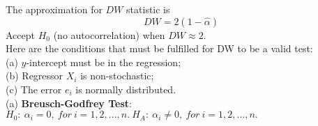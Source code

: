 \documentclass{article}
\begin{document}
\begin{enumerate}[S1 - ]
    The approximation for $DW$ statistic is
    \begin{equation*}
    DW = 2(1-\hat{\alpha})
    \end{equation*}
    Accept $H_0$ (no autocorrelation) when $DW \approx 2$.\\
    Here are the conditions that must be fulfilled for DW to be a valid test:\\
    (a) $y$-intercept must be in the regression;\\
    (b) Regressor $X_i$ is non-stochastic;\\
    (c) The error $e_i$ is normally distributed.\\
    (a) \textbf{Breusch-Godfrey Test}: $H_0:\ \alpha_i=0, \ for \ i=1,2,...,n. \ H_A:\ \alpha _i \neq 0, \ for\ i=1,2,...,n.$\\
    

\end{enumerate}
\end{document}
